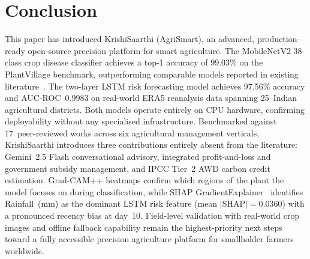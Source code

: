\documentclass[conference]{IEEEtran}
\begin{document}
\section{Conclusion}
\label{sec:conclusion}

This paper has introduced KrishiSaarthi (AgriSmart), an advanced, production-ready open-source precision platform for smart agriculture. The MobileNetV2 38-class crop disease classifier achieves a top-1 accuracy of 99.03\% on the PlantVillage benchmark, outperforming comparable models reported in existing literature~\cite{b8}. The two-layer LSTM risk forecasting model achieves 97.56\% accuracy and AUC-ROC~0.9983 on real-world ERA5 reanalysis data spanning 25~Indian agricultural districts. Both models operate entirely on CPU hardware, confirming deployability without any specialised infrastructure. Benchmarked against 17~peer-reviewed works across six agricultural management verticals, KrishiSaarthi introduces three contributions entirely absent from the literature: Gemini~2.5 Flash conversational advisory, integrated profit-and-loss and government subsidy management, and IPCC Tier~2 AWD carbon credit estimation. Grad-CAM++ heatmaps confirm which regions of the plant the model focuses on during classification, while SHAP GradientExplainer~\cite{lundberg2017} identifies Rainfall~(mm) as the dominant LSTM risk feature (mean $|$SHAP$|=0.0360$) with a pronounced recency bias at day~10. Field-level validation with real-world crop images and offline fallback capability remain the highest-priority next steps toward a fully accessible precision agriculture platform for smallholder farmers worldwide.
\end{document}
